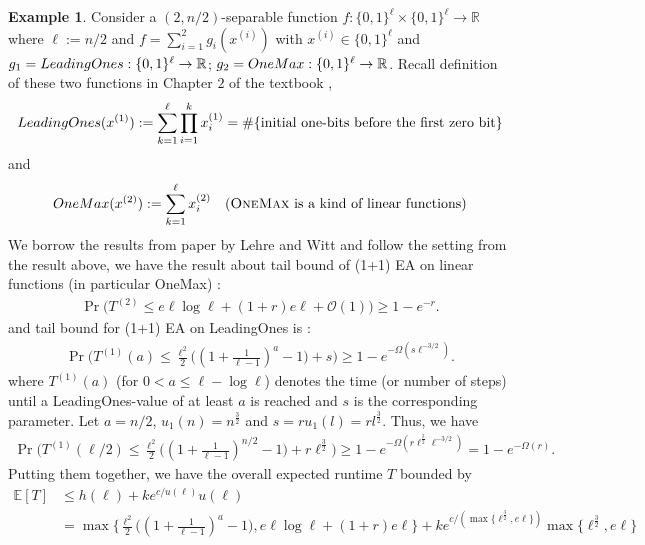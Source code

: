 \documentclass[a4paper,11pt]{report}
\theoremstyle{plain} %
\theoremstyle{definition} %
\newtheorem{eg}[thm]{Example}
\theoremstyle{remark} %
\begin{document}
\begin{eg} Consider a $(2,n/2)$-separable function $f:\{0,1\}^{\ell} \times \{0,1\}^{\ell} \rightarrow \mathbb{R}$ where $\ell:=n/2$ and $f=\sum_{i=1}^2 g_{i}(x^{(i)})$ with $x^{(i)}\in \{0,1\}^{\ell}$ and $g_{1}={\sc LeadingOnes}:\{0,1\}^{\ell} \rightarrow \mathbb{R}$; $g_{2}={\sc OneMax}:\{0,1\}^{\ell} \rightarrow \mathbb{R}$. Recall definition of these two functions in Chapter $2$ of the textbook \citep{doerr_theory_2020}, 
\begin{align*}
    {\sc LeadingOnes}(x^{(1)}):= \sum_{k=1}^{\ell} \prod_{i=1}^k x_{i}^{(1)} = \# \{ \text{initial one-bits before the first zero bit}\}
\end{align*}
and 
\begin{align*}
    {\sc OneMax}(x^{(2)}):= \sum_{k=1}^{\ell} x_{i}^{(2)} \quad \text{({\sc OneMax} is a kind of linear functions)}
\end{align*}
We borrow the results from paper \citep{lehre_general_2018} by Lehre and Witt and follow the setting from the result above, we have the result about tail bound of (1+1) EA on linear functions (in particular {\sc OneMax}) \citep{lehre_general_2018}:
 \begin{align}
     \Pr\big(T^{(2)}\leq e \ell \log \ell +(1+r) e \ell +\mathcal{O}(1) \big) \geq 1-e^{-r}. 
 \end{align}
and tail bound for (1+1) EA on {\sc LeadingOnes} is :
\begin{align*}
    \Pr\big(T^{(1)}(a) \leq \frac{{\ell}^2}{2} \Big( (1+\frac{1}{\ell -1})^a  -1\big)+ s  \Big) \geq 1-e^{-\Omega (s \ell ^{-3/2})}.
\end{align*}
where $T^{(1)}(a)$ (for $0<a\leq \ell -\log \ell$) denotes the time (or number of steps) until a {\sc LeadingOnes}-value of at least $a$ is reached and $s$ is the corresponding parameter. Let $a=n/2$, $u_{1}(n)=n^{\frac{3}{2}}$ and $s= r u_{1}(l) =r l^{\frac{3}{2}}$.  Thus, we have
\begin{align}
    \Pr\big(T^{(1)}(\ell/2) \leq \frac{{\ell}^2}{2} \Big( (1+\frac{1}{\ell -1})^{n/2}  -1\big)+  r \ell^{\frac{3}{2}}  \Big) \geq 1-e^{-\Omega (r \ell^{\frac{3}{2}} \ell ^{-3/2})} = 1-e^{-\Omega (r) }.
\end{align}
Putting them together, we have the overall expected runtime $T$ bounded by
\begin{align*}
    \mathbb{E}[T] &\leq h(\ell)+ke^{c/u(\ell)}u(\ell) \\
                  & =\max \{ \frac{\ell ^2}{2} \Big( (1+\frac{1}{\ell-1})^a  -1\Big) ,e \ell \log \ell +(1+r) e \ell \} + ke^{c/(\max \{ \ell^{\frac{3}{2}}  ,e\ell\})} \max \{\ell^{\frac{3}{2}}  ,e\ell\} \\

\end{align*}
\end{eg}
\end{document}

